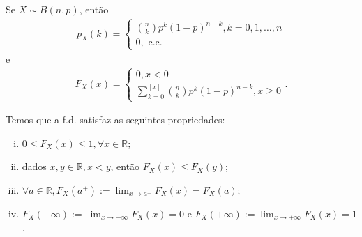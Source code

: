 \documentclass[../Notas.tex]{subfiles}
\begin{document}
\begin{example}
Se $X\sim B(n,p)$, então
\begin{align*}
    p_X(k) = \begin{cases}
    \binom{n}{k}p^k(1-p)^{n-k}, k = 0, 1, \dots, n \\
    0, \text{ c.c.}
    \end{cases}
\end{align*}
e
\begin{align*}
    F_X(x) = \begin{cases}
    0, x<0 \\
    \sum_{k=0}^{[x]}\binom{n}{k}p^k(1-p)^{n-k}, x\geq 0
    \end{cases}.
\end{align*}
\end{example}

\begin{proposition}
Temos que a f.d. satisfaz as seguintes propriedades:
\begin{enumerate}[(i)]
    \item $0 \leq F_X(x) \leq 1, \forall x\in\mathbb{R}$;
    \item dados $x,y\in\mathbb{R}, x < y$, então $F_X(x)\leq F_X(y)$;
    \item $\forall a\in\mathbb{R}, F_X(a^+) := \displaystyle{\lim_{x\to a^+}F_X(x) = F_X(a)}$;
    \item $F_X(-\infty) := \displaystyle{\lim_{x\to -\infty}F_X(x) = 0}$ e $F_X(+\infty) := \displaystyle{\lim_{x\to +\infty}F_X(x) = 1}$.
\end{enumerate}
\end{proposition}
\end{document}
